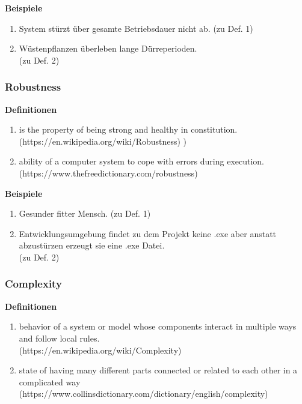 \documentclass[a4paper, 15pt]{scrartcl}
\begin{document}
					\textbf{Beispiele}
					\begin{enumerate}
						\item System stürzt über gesamte Betriebsdauer nicht ab. (zu Def. 1)
					
						\item Wüstenpflanzen überleben lange Dürreperioden. \\(zu Def. 2)
					\end{enumerate}
				
	\newpage
				\subsubsection*{Robustness}
					\textbf{Definitionen}
					\begin{enumerate}
						\item \grqq[...] is the property of being strong and healthy in constitution.\grqq \\
						(https://en.wikipedia.org/wiki/Robustness)
)
		
						\item \grqq[...] ability of a computer system to cope with errors during execution.\grqq\\ (https://www.thefreedictionary.com/robustness)
					\end{enumerate}
	
					\textbf{Beispiele}
					\begin{enumerate}
						\item Gesunder fitter Mensch. (zu Def. 1)
		
						\item Entwicklungsumgebung findet zu dem Projekt keine .exe aber anstatt abzustürzen erzeugt sie eine .exe Datei. \\(zu Def. 2)
					\end{enumerate}
	
	
					\subsubsection*{Complexity}
					\textbf{Definitionen}
					\begin{enumerate}
						\item \grqq[...] behavior of a system or model whose components interact in multiple ways and follow local rules.\grqq \\
						(https://en.wikipedia.org/wiki/Complexity)
		
						\item \grqq[...] state of having many different parts connected or related to each other in a complicated way\grqq\\ (https://www.collinsdictionary.com/dictionary/english/complexity)
					\end{enumerate}
	
\end{document}
